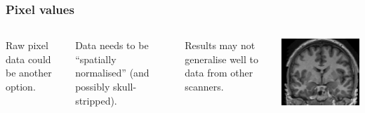 \begin{frame}
\frametitle{Pixel values}
\begin{columns}[c]
Raw pixel data could be another option.\par
Data needs to be ``spatially normalised'' (and possibly skull-stripped).\par
Results may not generalise well to data from other scanners.\par
{}
\includegraphics[width=\textwidth]{brain-raw}
\end{columns}
\end{frame}

